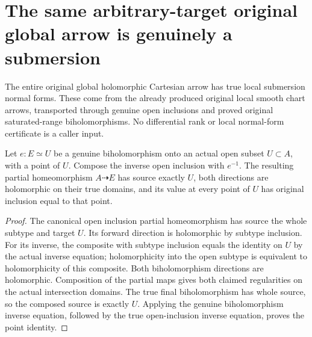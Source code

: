 \section{The same arbitrary-target original global arrow is genuinely a submersion}

The entire original global holomorphic Cartesian arrow has true local
submersion normal forms. These come from the already produced original
local smooth chart arrows, transported through genuine open inclusions and
proved original saturated-range biholomorphisms. No differential rank or
local normal-form certificate is a caller input.

\begin{lemma}
\label{hir:actual-open-range-biholomorphism-partial-inverse}
\leanok
Let $e:E\simeq U$ be a genuine biholomorphism onto an actual open subset
$U\subset A$, with a point of $U$. Compose the inverse open inclusion with
$e^{-1}$. The resulting partial homeomorphism $A\dashrightarrow E$ has
source exactly $U$, both directions are holomorphic on their true domains,
and its value at every point of $U$ has original inclusion equal to that
point.
\end{lemma}
\begin{proof}
The canonical open inclusion partial homeomorphism has source the whole
subtype and target $U$. Its forward direction is holomorphic by subtype
inclusion. For its inverse, the composite with subtype inclusion equals
the identity on $U$ by the actual inverse equation; holomorphicity into
the open subtype is equivalent to holomorphicity of this composite. Both
biholomorphism directions are holomorphic. Composition of the partial
maps gives both claimed regularities on the actual intersection domains.
The true final biholomorphism has whole source, so the composed source
is exactly $U$. Applying the genuine biholomorphism inverse equation,
followed by the true open-inclusion inverse equation, proves the point
identity.
\end{proof}


